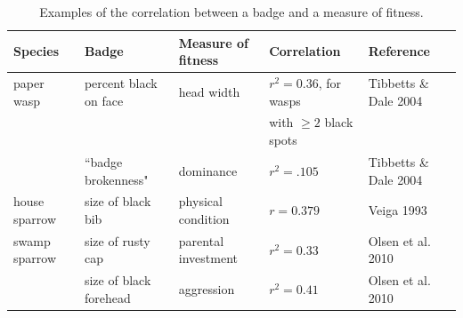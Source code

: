 \begin{table}
\caption{\label{corr_examples} Examples of the correlation between a badge and a measure of fitness.}
\begin{tabular}{lllll}
Species & Badge & Measure of fitness & Correlation & Reference
\\\hline paper wasp & percent black on face & head width & $r^2=0.36$, for wasps  & Tibbetts \& Dale 2004
\\ & & & with $\geq 2$ black spots
\\ & ``badge brokenness" & dominance & $r^2=.105$ & Tibbetts \& Dale 2004
\\ \hline house sparrow & size of black bib & physical condition & $r=0.379$ & Veiga 1993
\\ \hline swamp sparrow & size of rusty cap & parental investment & $r^2=0.33$ & Olsen et al. 2010
\\ & size of black forehead & aggression & $r^2=0.41$ & Olsen et al. 2010
\end{tabular}
\end{table}


